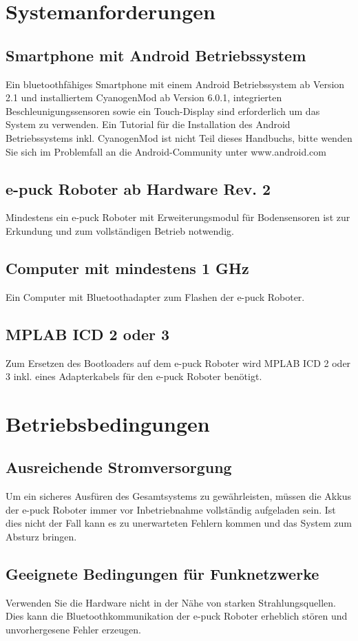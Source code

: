 \documentclass[10pt,a4paper]{article}
\let\oldsection\section
\renewcommand{\section}{\newpage \oldsection}
\begin{document}
\section{Systemanforderungen}
		\subsection{Smartphone mit Android Betriebssystem} 
				Ein bluetoothf\"ahiges Smartphone mit einem Android Betriebssystem ab Version 2.1 und installiertem CyanogenMod ab Version 6.0.1, integrierten 
				Beschleunigungssensoren sowie ein Touch-Display sind erforderlich um das System zu verwenden. Ein Tutorial f\"ur die Installation des Android 
				Betriebssystems inkl. CyanogenMod ist nicht Teil dieses Handbuchs, bitte wenden Sie sich im Problemfall an die Android-Community unter 
				www.android.com
		\subsection{e-puck Roboter ab Hardware Rev. 2} 
				Mindestens ein e-puck Roboter mit Erweiterungsmodul f\"ur Bodensensoren ist zur Erkundung und zum vollst\"andigen Betrieb notwendig.
		\subsection{Computer mit mindestens 1 GHz} 
				Ein Computer mit Bluetoothadapter zum Flashen der e-puck Roboter.
		\subsection{MPLAB ICD 2 oder 3} 
				Zum Ersetzen des Bootloaders auf dem e-puck Roboter wird MPLAB ICD 2 oder 3 inkl. eines Adapterkabels f\"ur den e-puck Roboter ben\"otigt.
\section{Betriebsbedingungen} 
		\subsection{Ausreichende Stromversorgung} 
				Um ein sicheres Ausf\"uren des Gesamtsystems zu gew\"ahrleisten, m\"ussen die Akkus der e-puck Roboter immer vor Inbetriebnahme vollst\"andig
				aufgeladen sein. Ist dies nicht der Fall kann es zu unerwarteten Fehlern kommen und das System zum Absturz bringen.
		\subsection{Geeignete Bedingungen f\"ur Funknetzwerke} 
				Verwenden Sie die Hardware nicht in der N\"ahe von starken Strahlungsquellen. Dies kann die Bluetoothkommunikation der e-puck Roboter erheblich st\"oren 				und unvorhergesene Fehler erzeugen.
\end{document}
